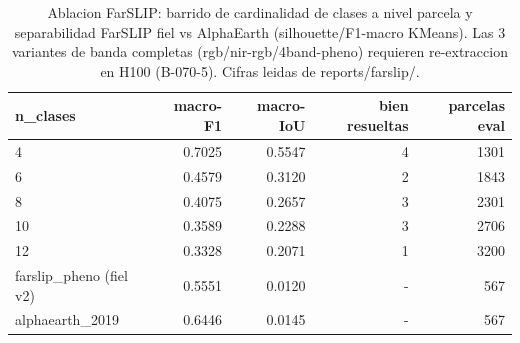\begin{table}
\caption{Ablacion FarSLIP: barrido de cardinalidad de clases a nivel parcela y separabilidad FarSLIP fiel vs AlphaEarth (silhouette/F1-macro KMeans). Las 3 variantes de banda completas (rgb/nir-rgb/4band-pheno) requieren re-extraccion en H100 (B-070-5). Cifras leidas de reports/farslip/.}
\label{tab:farslip_band_ablation}
\begin{tabular}{lrrrr}
\toprule
n\_clases & macro-F1 & macro-IoU & bien resueltas & parcelas eval \\
\midrule
4 & 0.7025 & 0.5547 & 4 & 1301 \\
6 & 0.4579 & 0.3120 & 2 & 1843 \\
8 & 0.4075 & 0.2657 & 3 & 2301 \\
10 & 0.3589 & 0.2288 & 3 & 2706 \\
12 & 0.3328 & 0.2071 & 1 & 3200 \\
farslip\_pheno (fiel v2) & 0.5551 & 0.0120 & - & 567 \\
alphaearth\_2019 & 0.6446 & 0.0145 & - & 567 \\
\bottomrule
\end{tabular}
\end{table}
